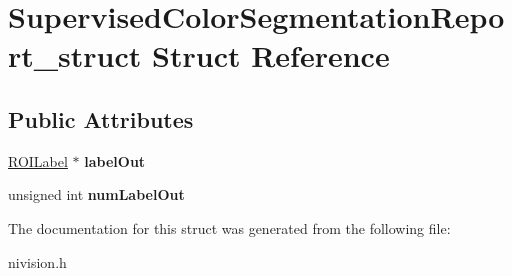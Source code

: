 \hypertarget{structSupervisedColorSegmentationReport__struct}{
\section{SupervisedColorSegmentationReport\_\-struct Struct Reference}
\label{structSupervisedColorSegmentationReport__struct}
}
\subsection*{Public Attributes}
\begin{DoxyCompactItemize}
\item 
\hypertarget{structSupervisedColorSegmentationReport__struct_a7ad724acbf4a40b62c6744a1fc6fd972}{
\hyperlink{structROILabel__struct}{ROILabel} $\ast$ {\bfseries labelOut}}
\label{structSupervisedColorSegmentationReport__struct_a7ad724acbf4a40b62c6744a1fc6fd972}

\item 
\hypertarget{structSupervisedColorSegmentationReport__struct_a4bf59e864245ea972e04df8115768786}{
unsigned int {\bfseries numLabelOut}}
\label{structSupervisedColorSegmentationReport__struct_a4bf59e864245ea972e04df8115768786}

\end{DoxyCompactItemize}


The documentation for this struct was generated from the following file:\begin{DoxyCompactItemize}
\item 
nivision.h\end{DoxyCompactItemize}
